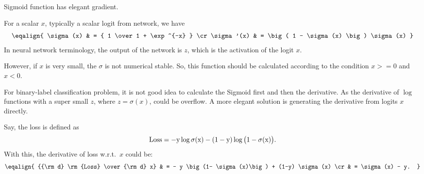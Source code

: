 


Sigmoid function has elegant gradient.

For a scalar $x$, typically a scalar logit from network, we have
%
$$
    \eqalign{
        \sigma(x)  & = { 1 \over 1 + \exp^{-x} } \cr
        \sigma'(x) & = \big( 1 - \sigma(x) \big) \sigma(x)
    }
$$
In neural network terminology, the output of the network is $z$, which is the
activation of the logit $x$.

However, if $x$ is very small, the $\sigma$ is not numerical stable. So, this
function should be calculated according to the condition $x>=0$ and $x<0$.

For binary-label classification problem, it is not good idea to calculate the
Sigmoid first and then the derivative. As the derivative of $\log$ functions
with a super small $z$, where $z=\sigma(x)$,  could be overflow. A more elegant
solution is generating the derivative from logits $x$ directly.

Say, the loss is defined as
%
$$
    \rm{Loss} = - y \log \sigma(x) - (1-y) \log \big(1-\sigma(x)\big).
$$
With this, the derivative of loss w.r.t.~$x$ could be:
%
$$
    \eqalign{
        {{\rm d} \rm{Loss} \over {\rm d} x}
            & = - y \big(1- \sigma(x)\big) + (1-y) \sigma(x) \cr
            & = \sigma(x) - y.
    }
$$

\vfill
\bye
